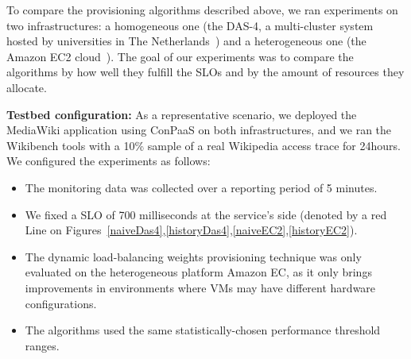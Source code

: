 To compare the provisioning algorithms described above, we ran experiments
on two infrastructures: a homogeneous one (the DAS-4, a multi-cluster system
hosted by universities in The Netherlands~\cite{das4}) and a heterogeneous
one (the Amazon EC2 cloud~\cite{amazonEC2}). The goal of our experiments
was to compare the algorithms by how well they fulfill the SLOs and by
the amount of resources they allocate.



\textbf{Testbed configuration:}  As a representative scenario, we deployed the MediaWiki application using ConPaaS on both infrastructures, and we ran the Wikibench tools with a 10\% sample of a real Wikipedia access trace for 24hours. 
We configured the experiments as follows: 

\begin{itemize}

\item The monitoring data was collected over a reporting period of 5 minutes.

\item We fixed a SLO of 700 milliseconds at the service's side (denoted by a red Line on Figures~\ref{naiveDas4},\ref{historyDas4},\ref{naiveEC2},\ref{historyEC2}).


\item The dynamic load-balancing weights provisioning technique was only evaluated on the heterogeneous platform Amazon EC, as it only brings improvements in environments where VMs may have different hardware configurations. 

\item The algorithms used the same statistically-chosen performance threshold ranges. 

\end{itemize}


